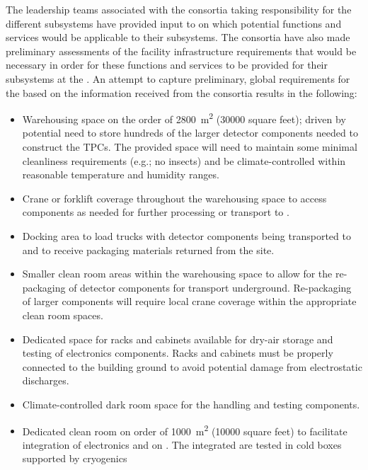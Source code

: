 The leadership teams associated with the  %
consortia taking responsibility for the different 
subsystems have provided input to  on which potential
 functions and services would be applicable to their
subsystems.  The consortia have also made preliminary assessments of
the facility infrastructure requirements that would be necessary in
order for these functions and services to be provided for their
subsystems at the .  An attempt to capture preliminary,
global requirements for the  based on the information
received from the consortia results in the following:
\begin{itemize}
  \item Warehousing space on the order of \SI{2800}{m^2} (\num{30000} square feet); driven by
    potential need to store hundreds of the larger detector components
    needed to construct the TPCs.  The provided space will need to
    maintain some minimal cleanliness requirements (e.g.; no insects)
    and be climate-controlled within reasonable temperature and
    humidity ranges.
  \item Crane or forklift coverage throughout the warehousing
    space to access components as needed for further processing or
    transport to \surf.
  \item Docking area to load trucks with detector components being
    transported to \surf and to receive packaging materials
    returned from the site.
  \item Smaller clean room areas within the warehousing space to
    allow for the re-packaging of detector components for transport
    underground.  Re-packaging of larger components
    will require local crane coverage within the appropriate clean room
    spaces.
  \item Dedicated space for racks and cabinets available for dry-air
    storage and testing of electronics components.  Racks and cabinets
    must be properly connected to the building ground to avoid
    potential damage from electrostatic discharges.
  \item Climate-controlled dark room space for the handling and
    testing  components.
  \item Dedicated clean room on order of \SI{1000}{m^2} (\num{10000} square feet) to facilitate
    integration of electronics and  on .
    The
    integrated  are tested in cold boxes supported by cryogenics

\end{itemize}
